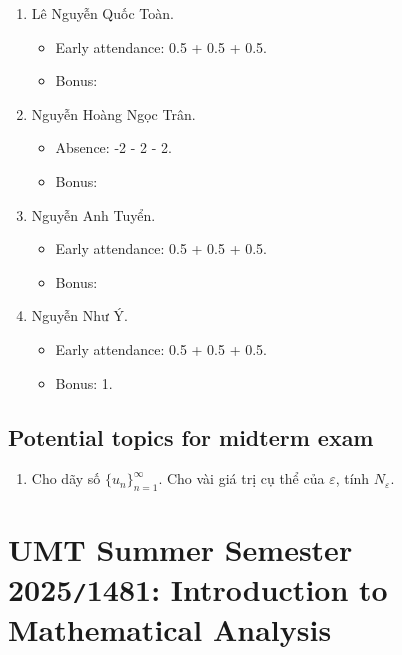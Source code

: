 \documentclass{article}
\begin{document}
\begin{enumerate}
	\item {\sc Lê Nguyễn Quốc Toàn.}
	\begin{itemize}
		\item Early attendance: 0.5 + 0.5 + 0.5.
		\item Bonus: 
	\end{itemize}
	\item {\sc Nguyễn Hoàng Ngọc Trân.}
	\begin{itemize}
		\item Absence: -2 - 2 - 2.
		\item Bonus: 
	\end{itemize}
	\item {\sc Nguyễn Anh Tuyển.}
	\begin{itemize}
		\item Early attendance: 0.5 + 0.5 + 0.5.
		\item Bonus: 
	\end{itemize}
	\item {\sc Nguyễn Như Ý.}
	\begin{itemize}
		\item Early attendance: 0.5 + 0.5 + 0.5.
		\item Bonus: 1.
	\end{itemize}
\end{enumerate}


\subsection{Potential topics for midterm exam}

\begin{enumerate}
	\item Cho dãy số $\{u_n\}_{n=1}^\infty$. Cho vài giá trị cụ thể của $\varepsilon$, tính $N_\varepsilon$.
\end{enumerate}


\section{UMT Summer Semester 2025{\tt/}1481: Introduction to Mathematical Analysis}
\end{document}
